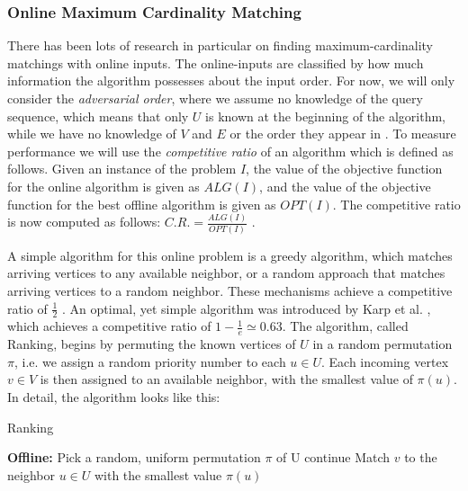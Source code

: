 \subsubsection{Online Maximum Cardinality Matching}
There has been lots of research in particular on finding maximum-cardinality matchings with online inputs. The online-inputs are classified by how much information the algorithm possesses about the input order. For now, we will only consider the \emph{adversarial order}, where we assume no knowledge of the query sequence, which means that only $U$ is known at the beginning of the algorithm, while we have no knowledge of $V$ and $E$ or the order they appear in \cite{Mehta:Online}. To measure performance we will use the \emph{competitive ratio} of an algorithm which is defined as follows. Given an instance of the problem $I$, the value of the objective function for the online algorithm is given as $ALG(I)$, and the value of the objective function for the best offline algorithm is given as $OPT(I)$. The competitive ratio is now computed as follows: $C.R.=\frac{ALG(I)}{OPT(I)}$ \cite{Mehta:Online}.

A simple algorithm for this online problem is a greedy algorithm, which matches arriving vertices to any available neighbor, or a random approach that matches arriving vertices to a random neighbor. These mechanisms achieve a competitive ratio of $\frac{1}{2}$ \cite{Mehta:Online}. An optimal, yet simple algorithm was introduced by Karp et al. \cite{Karp:Online}, which achieves a competitive ratio of $1 - \frac{1}{e} \simeq 0.63$. The algorithm, called Ranking, begins by permuting the known vertices of $U$ in a random permutation $\pi$, i.e. we assign a random priority number to each $u \in U$. Each incoming vertex $v \in V$ is then assigned to an available neighbor, with the smallest value of $\pi(u)$. In detail, the algorithm looks like this:

\begin{algorithm} %
    \caption{Ranking} 
    \label{alg:ranking} %
    \begin{algorithmic} %
        \State \textbf{Offline:} Pick a random, uniform permutation $\pi$ of U
                \State continue
            \EndIf
            \State Match $v$ to the neighbor $u \in U$ with the smallest value $\pi(u)$
        \EndFor
    \end{algorithmic}
\end{algorithm}